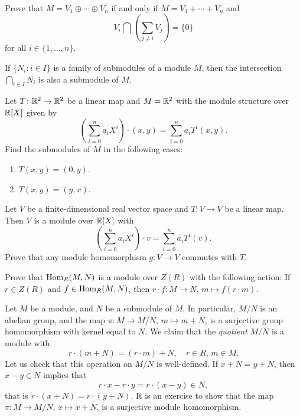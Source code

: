 \begin{exercise}
Prove that $M=V_1\oplus\cdots\oplus V_n$ if and only if 
$M=V_1+\cdots+V_n$ and 
\[
V_i\bigcap\left(\sum_{j\ne i}V_j\right)=\{0\}
\]	
for all $i\in\{1,\dots,n\}$.
\end{exercise}

If $\{N_i:i\in I\}$ is a family of submodules of a module $M$, then the intersection  
$\bigcap_{i\in I}N_i$ is also a submodule of $M$.

\begin{exercise}
\label{xca:submodules}
Let $T\colon\mathbb{R}^2\to\mathbb{R}^2$ be a linear map and $M=\mathbb{R}^2$ with the module structure 
over $\mathbb{R}[X]$ given by
\[
\left(\sum_{i=0}^n a_iX^i\right)\cdot (x,y)=\sum_{i=0}^n a_iT^i(x,y).
\]
Find the submodules of $M$ in the following cases: 
\begin{enumerate}
    \item $T(x,y)=(0,y)$.
    \item $T(x,y)=(y,x)$.
\end{enumerate}
\end{exercise}

\begin{exercise}
\label{xca:commuting}
Let $V$ be a finite-dimensional real vector space and $T\colon V\to V$ be a linear map. Then 
$V$ is a module over $\mathbb{R}[X]$ with  
\[
\left(\sum_{i=0}^n a_iX^i\right)\cdot v=\sum_{i=0}^n a_iT^i(v).
\]
Prove that any module homomorphism $g\colon V\to V$ commutes with $T$. 
\end{exercise}

\begin{exercise}
\label{xca:Hom}
Prove that $\operatorname{Hom}_R(M,N)$ is a module over $Z(R)$ with the following action: 
If $r\in Z(R)$ and
$f\in\operatorname{Hom}_R(M,N)$, then $r\cdot f\colon M\to N$, $m\mapsto f(r\cdot m)$. 
\end{exercise}

Let $M$ be a module, and $N$ be a submodule of $M$. In particular, $M/N$ is an abelian group, and the map $\pi\colon M\to M/N$, $m\mapsto m+N$, is a surjective group homomorphism with kernel equal to $N$. We claim
that the \emph{quotient} $M/N$ is a module with  
\[
r\cdot (m+N)=(r\cdot m)+N,\quad
r\in R,\,m\in M. 
\]
Let us check that this operation on $M/N$ is well-defined. If $x+N=y+N$, then
$x-y\in N$ implies that  
\[
r\cdot x-r\cdot y=r\cdot (x-y)\in N,
\]
that is $r\cdot (x+N)=r\cdot (y+N)$. It is an exercise to show that
the map $\pi\colon M\to M/N$, $x\mapsto x+N$, is a 
surjective module homomorphism. 

